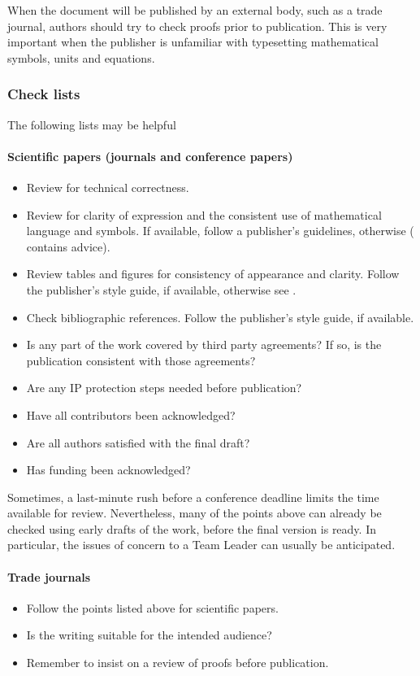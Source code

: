When the document will be published by an external body, such as a trade journal, authors should try to check proofs prior to publication. This is very important when the publisher is unfamiliar with typesetting mathematical symbols, units and equations.  

\subsubsection{Check lists}
The following lists may be helpful
\paragraph{Scientific papers (journals and conference papers)}
\begin{itemize}
\item  Review for technical correctness.
\item  Review for clarity of expression and the consistent use of mathematical language and symbols.  If available, follow a publisher's guidelines, otherwise (\cite[\S\ref*{GRP-s:scientific_documents}]{MSL_Reporting_Guidelines} contains advice).
\item  Review tables and figures for consistency of appearance and clarity. Follow the publisher's style guide, if available, otherwise see \cite[\S\ref*{GRP-s:scientific_documents}]{MSL_Reporting_Guidelines}.
\item  Check bibliographic references. Follow the publisher's style guide, if available.
\item  Is any part of the work covered by third party agreements? If so, is the publication consistent with those agreements? 
\item  Are any IP protection steps needed before publication?
\item  Have all contributors been acknowledged?
\item  Are all authors satisfied with the final draft?
\item  Has funding been acknowledged?
\end{itemize}

Sometimes, a last-minute rush before a conference deadline limits the time available for review. Nevertheless, many of the points above can already be checked using early drafts of the work, before the final version is ready. In particular, the issues of concern to a Team Leader can usually be anticipated.

\paragraph{Trade journals}
\begin{itemize}
\item  Follow the points listed above for scientific papers.
\item  Is the writing suitable for the intended audience?
\item  Remember to insist on a review of proofs before publication.
\end{itemize} 

